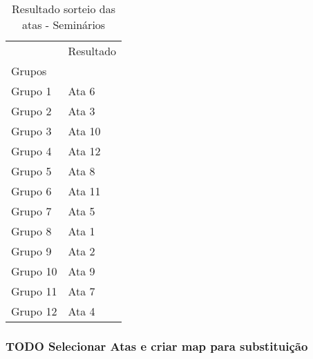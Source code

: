 \documentclass[11pt]{article}
\begin{document}
\begin{table}
\centering
\caption{Resultado sorteio das atas - Seminários}
\begin{tabular}{ll}
\toprule
{} & Resultado \\
Grupos   &           \\
\midrule
Grupo 1  &     Ata 6 \\
Grupo 2  &     Ata 3 \\
Grupo 3  &    Ata 10 \\
Grupo 4  &    Ata 12 \\
Grupo 5  &     Ata 8 \\
Grupo 6  &    Ata 11 \\
Grupo 7  &     Ata 5 \\
Grupo 8  &     Ata 1 \\
Grupo 9  &     Ata 2 \\
Grupo 10 &     Ata 9 \\
Grupo 11 &     Ata 7 \\
Grupo 12 &     Ata 4 \\
\bottomrule
\end{tabular}
\end{table}


\subsubsection{{\bfseries\sffamily TODO} Selecionar Atas e criar map para substituição}
\label{sec:orgf1fa6fb}
\end{document}
